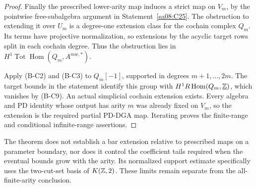 \begin{proof}
Finally the prescribed lower-arity
map induces a strict map on $V_m$,
by the pointwise free-subalgebra
argument in Statement~\ref{sa08:C25}.
The obstruction to extending it
over $U_m$ is a degree-one
extension class for the cochain
complex $Q_m$. Its terms have
projective normalization, so
extensions by the acyclic target
rows split in each cochain
degree. Thus the obstruction
lies in
$H^1\operatorname{Tot}\operatorname{Hom}
 (Q_m,A^{mw,*})$.

Apply (B-C2) and (B-C3) to
$Q_m[-1]$, supported in degrees
$m+1,\ldots,2m$. The target bounds
in the statement identify this
group with
$H^1R\operatorname{Hom}
 (Q_m,\underline{\mathbb Z})$, which
vanishes by (B-C9). An actual
simplicial cochain extension exists.
Every algebra and PD identity
whose output has arity $m$ was
already fixed on $V_m$, so the
extension is the required partial
PD-DGA map. Iterating proves the
finite-range and conditional
infinite-range assertions.
\end{proof}

The theorem does not establish a bar extension
relative to prescribed maps on a parameter
boundary, nor does it control the coefficient
tails required when the eventual bounds grow
with the arity. Its normalized support
estimate specifically uses the two-cut-set
basis of $K(\mathbb Z,2)$. These limits remain
separate from the all-finite-arity conclusion.
